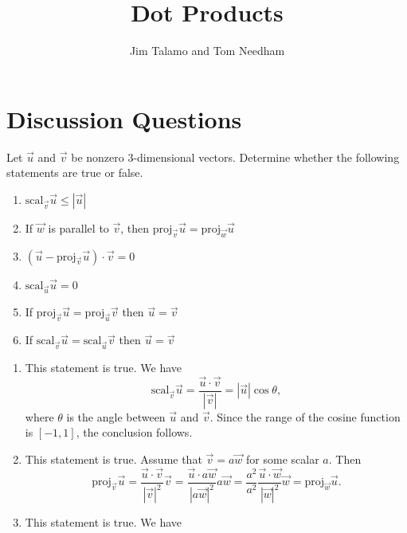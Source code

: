 \documentclass[]{ximera}
\author{Jim Talamo and Tom Needham}
\title[Collaborate:]{Dot Products}
\begin{document}
\begin{abstract}
\end{abstract}
\maketitle

\section{Discussion Questions}

\begin{problem}
Let $\vec{u}$ and $\vec{v}$ be nonzero $3$-dimensional vectors. Determine whether the following statements are true or false. 

\begin{enumerate}[label=(\alph*)]
\item $\mathrm{scal}_{\vec{v}} \vec{u} \leq \left|\vec{u}\right|$
\item If $\vec{w}$ is parallel to $\vec{v}$, then $\mathrm{proj}_\vec{v} \vec{u} = \mathrm{proj}_\vec{w} \vec{u}$
\item $(\vec{u} - \mathrm{proj}_\vec{v} \vec{u}) \cdot \vec{v} = 0$ 
\item $\mathrm{scal}_\vec{u} \vec{u} = 0$ 
\item If $\mathrm{proj}_\vec{v} \vec{u} = \mathrm{proj}_\vec{u} \vec{v}$ then $\vec{u} = \vec{v}$ 
\item If $\mathrm{scal}_\vec{v} \vec{u} = \mathrm{scal}_\vec{u} \vec{v}$ then $\vec{u} = \vec{v}$ 
\end{enumerate}
\begin{solution}
\begin{enumerate}[label=(\alph*)]
\item This statement is true. We have 
$$
\mathrm{scal}_{\vec{v}} \vec{u} = \frac{\vec{u} \cdot \vec{v}}{\left|\vec{v}\right|} = \left|\vec{u}\right| \cos \theta,
$$
where $\theta$ is the angle between $\vec{u}$ and $\vec{v}$. Since the range of the cosine function is $[-1,1]$, the conclusion follows.
\item This statement is true. Assume that $\vec{v} = a \vec{w}$ for some scalar $a$. Then
$$
\mathrm{proj}_\vec{v} \vec{u} = \frac{\vec{u} \cdot \vec{v}}{\left|\vec{v}\right|^2} \vec{v} = \frac{\vec{u} \cdot a \vec{w}}{\left|a \vec{w}\right|^2} a \vec{w} = \frac{a^2}{a^2} \frac{\vec{u} \cdot \vec{w}}{\left|\vec{w}\right|^2} \vec{w} = \mathrm{proj}_\vec{w} \vec{u}.
$$
\item This statement is true. We have

\end{enumerate}
\end{solution}
\end{problem}
\end{document}
